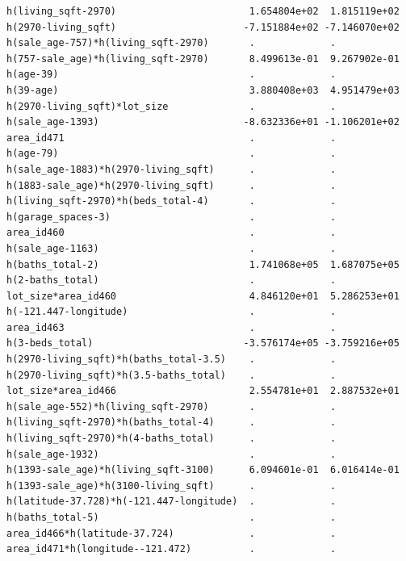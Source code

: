 \documentclass[
]{article}
\begin{document}
\begin{verbatim}
h(living_sqft-2970)                       1.654804e+02  1.815119e+02
h(2970-living_sqft)                      -7.151884e+02 -7.146070e+02
h(sale_age-757)*h(living_sqft-2970)       .             .           
h(757-sale_age)*h(living_sqft-2970)       8.499613e-01  9.267902e-01
h(age-39)                                 .             .           
h(39-age)                                 3.880408e+03  4.951479e+03
h(2970-living_sqft)*lot_size              .             .           
h(sale_age-1393)                         -8.632336e+01 -1.106201e+02
area_id471                                .             .           
h(age-79)                                 .             .           
h(sale_age-1883)*h(2970-living_sqft)      .             .           
h(1883-sale_age)*h(2970-living_sqft)      .             .           
h(living_sqft-2970)*h(beds_total-4)       .             .           
h(garage_spaces-3)                        .             .           
area_id460                                .             .           
h(sale_age-1163)                          .             .           
h(baths_total-2)                          1.741068e+05  1.687075e+05
h(2-baths_total)                          .             .           
lot_size*area_id460                       4.846120e+01  5.286253e+01
h(-121.447-longitude)                     .             .           
area_id463                                .             .           
h(3-beds_total)                          -3.576174e+05 -3.759216e+05
h(2970-living_sqft)*h(baths_total-3.5)    .             .           
h(2970-living_sqft)*h(3.5-baths_total)    .             .           
lot_size*area_id466                       2.554781e+01  2.887532e+01
h(sale_age-552)*h(living_sqft-2970)       .             .           
h(living_sqft-2970)*h(baths_total-4)      .             .           
h(living_sqft-2970)*h(4-baths_total)      .             .           
h(sale_age-1932)                          .             .           
h(1393-sale_age)*h(living_sqft-3100)      6.094601e-01  6.016414e-01
h(1393-sale_age)*h(3100-living_sqft)      .             .           
h(latitude-37.728)*h(-121.447-longitude)  .             .           
h(baths_total-5)                          .             .           
area_id466*h(latitude-37.724)             .             .           
area_id471*h(longitude--121.472)          .             .           
                                                                    

\end{verbatim}
\end{document}
